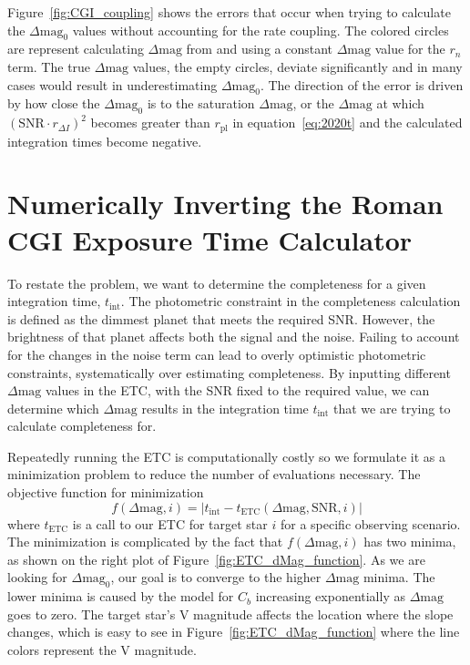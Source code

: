 Figure~\ref{fig:CGI_coupling} shows the errors that occur when trying to
calculate the $\Delta\textrm{mag}_0$ values without accounting for the rate
coupling. The colored circles are represent calculating $\Delta\textrm{mag}$
from  and using a constant
$\Delta\textrm{mag}$ value for the $r_n$ term. The true $\Delta\textrm{mag}$
values, the empty circles, deviate significantly and in many cases would result
in underestimating $\Delta\textrm{mag}_0$. The direction of the error is driven
by how close the $\Delta\textrm{mag}_0$ is to the saturation
$\Delta\textrm{mag}$, or the $\Delta\textrm{mag}$ at which $\left(\textrm{SNR}
\cdot r_{\Delta I}\right)^2$ becomes greater than $r_{\textrm{pl}}$ in
equation~\ref{eq:2020t} and the calculated integration times become
negative.



\section{Numerically Inverting the Roman CGI Exposure Time Calculator}
\label{sec:numerically_inverting_ETC}

To restate the problem, we want to determine the completeness for a given
integration time, $t_{\textrm{int}}$. The photometric constraint in the
completeness calculation is defined as the dimmest planet that meets the
required SNR. However, the brightness of that planet affects both the signal
and the noise. Failing to account for the changes in the noise term can lead to
overly optimistic photometric constraints, systematically over estimating
completeness. By inputting different $\Delta\textrm{mag}$ values in the
ETC, with the SNR fixed to the required value, we can
determine which $\Delta\textrm{mag}$ results in the integration time
$t_{\textrm{int}}$ that we are trying to calculate completeness for.

Repeatedly running the ETC is computationally costly so we formulate it as a
minimization problem to reduce the number of evaluations necessary. The
objective function for minimization
\begin{equation}
  f(\Delta\textrm{mag}, i) = |t_{\textrm{int}} -
  t_{\textrm{ETC}}(\Delta\textrm{mag}, \textrm{SNR}, i)|
  \label{eq:intTime_root_obj}
\end{equation}
where $t_{\textrm{ETC}}$ is a call to our ETC for target star $i$ for a
specific observing scenario. The minimization is complicated by the fact that
$f\left(\Delta\textrm{mag}, i\right)$ has two minima, as shown on the right plot of
Figure~\ref{fig:ETC_dMag_function}. As we are looking for
$\Delta\textrm{mag}_0$, our goal is to converge to the higher
$\Delta\textrm{mag}$ minima. The lower minima is caused by the model for $C_b$
increasing exponentially as $\Delta\textrm{mag}$ goes to zero. The target
star's V magnitude affects the location where the slope changes, which is easy
to see in Figure~\ref{fig:ETC_dMag_function} where the line colors represent
the V magnitude.

